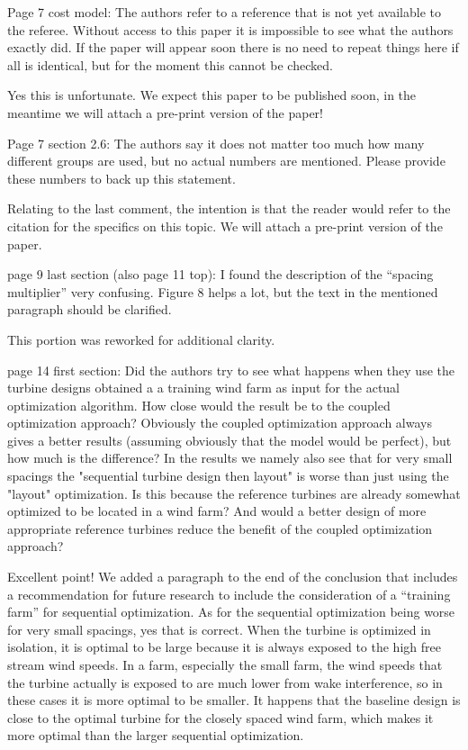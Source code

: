 \documentclass[12pt]{report}
\begin{document}
\bigskip \color{black}
Page 7 cost model: The authors refer to a reference that is not yet available to the referee. Without access to this paper it is impossible to see what the authors exactly did. If the paper will appear soon there is no need to repeat things here if all is identical, but for the moment this cannot be checked.

\color{blue} Yes this is unfortunate. We expect this paper to be published soon, in the meantime we will attach a pre-print version of the paper!

\bigskip \color{black}
Page 7 section 2.6: The authors say it does not matter too much how many different groups are used, but no actual numbers are mentioned. Please provide these numbers to back up this statement.

\color{blue} Relating to the last comment, the intention is that the reader would refer to the citation for the specifics on this topic. We will attach a pre-print version of the paper.

\bigskip \color{black}
page 9 last section (also page 11 top): I found the description of the ``spacing multiplier'' very confusing. Figure 8 helps a lot, but the text in the mentioned paragraph
should be clarified.

\color{blue} This portion was reworked for additional clarity.

\bigskip \color{black}
page 14 first section: Did the authors try to see what happens when they use the turbine designs obtained a a training wind farm as input for the actual optimization algorithm. How close would the result be to the coupled optimization approach? Obviously the coupled optimization approach always gives a better results (assuming obviously that the model would be perfect), but how much is the difference? In the results we namely also see that for very small spacings the "sequential turbine design then layout" is worse than just using the "layout" optimization. Is this because the reference turbines are already somewhat optimized to be located in a wind farm? And would a better design of more appropriate reference turbines reduce the benefit of the coupled optimization approach?

\color{blue} Excellent point! We added a paragraph to the end of the conclusion that includes a recommendation for future research to include the consideration of a ``training farm'' for sequential optimization. As for the sequential optimization being worse for very small spacings, yes that is correct. When the turbine is optimized in isolation, it is optimal to be large because it is always exposed to the high free stream wind speeds. In a farm, especially the small farm, the wind speeds that the turbine actually is exposed to are much lower from wake interference, so in these cases it is more optimal to be smaller. It happens that the baseline design is close to the optimal turbine for the closely spaced wind farm, which makes it more optimal than the larger sequential optimization. 
\end{document}

